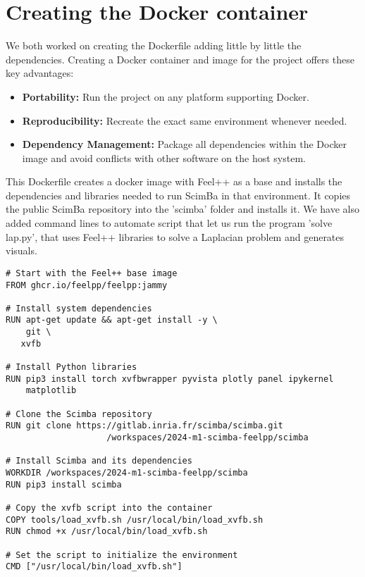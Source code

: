 \documentclass[12pt]{article}
\begin{document}
\section{Creating the Docker container}
We both worked on creating the Dockerfile adding little by little the dependencies.
Creating a Docker container and image for the project offers these key advantages:
\begin{itemize}
        \item \textbf{Portability:} Run the project on any platform supporting Docker.
        \item \textbf{Reproducibility:} Recreate the exact same environment whenever needed.
        \item \textbf{Dependency Management:} Package all dependencies within the Docker image and avoid conflicts with other software on the host system.   
\end{itemize}
This Dockerfile creates a docker image with Feel++ as a base and installs the dependencies and libraries needed to run ScimBa in that environment.
It copies the public ScimBa repository into the 'scimba' folder and installs it.
We have also added command lines to automate script that let us run the program 'solve lap.py', that uses Feel++ libraries to solve a Laplacian problem and generates visuals.

\begin{lstlisting}[language=docker,caption={Dockerfile for Feel++, Scimba, and Python libraries.},frame=single, backgroundcolor=\color{gray!10}, basicstyle=\footnotesize,rulecolor=\color{blue}, framexleftmargin=3pt, commentstyle=\color{mygreen}, keywordstyle=\color{blue}]
# Start with the Feel++ base image
FROM ghcr.io/feelpp/feelpp:jammy

# Install system dependencies
RUN apt-get update && apt-get install -y \
    git \
   xvfb

# Install Python libraries
RUN pip3 install torch xvfbwrapper pyvista plotly panel ipykernel
    matplotlib

# Clone the Scimba repository
RUN git clone https://gitlab.inria.fr/scimba/scimba.git 
                    /workspaces/2024-m1-scimba-feelpp/scimba

# Install Scimba and its dependencies
WORKDIR /workspaces/2024-m1-scimba-feelpp/scimba
RUN pip3 install scimba

# Copy the xvfb script into the container
COPY tools/load_xvfb.sh /usr/local/bin/load_xvfb.sh
RUN chmod +x /usr/local/bin/load_xvfb.sh

# Set the script to initialize the environment
CMD ["/usr/local/bin/load_xvfb.sh"]

\end{lstlisting}
\end{document}
